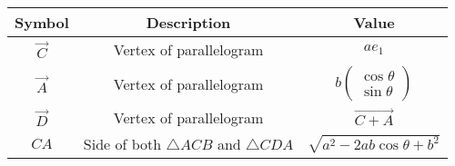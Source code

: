    \begin{tabular}{|c|c|c|}
    \hline
        \textbf{Symbol} &\textbf{Description}&\textbf{Value}  \\
        \hline
        $\vec{C}$&Vertex of parallelogram &$ae_1$\\
        \hline
         $\vec{A}$&Vertex of parallelogram &$b\begin{pmatrix}
             \cos{\theta}\\
             \sin{\theta}
         \end{pmatrix}$\\
        \hline
        $\vec{D}$&Vertex of parallelogram &$\vec{C+A}$\\
        \hline
        $CA$& Side of both $\triangle ACB$ and $\triangle CDA$ &$\sqrt{a^2-2ab\cos{\theta}+b^2}$\\
        \hline
    \end{tabular}

